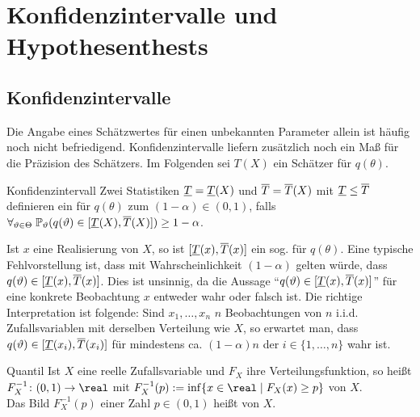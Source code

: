 \chapter{%
    Konfidenzintervalle und Hypothesenthests%
}

\section{%
    Konfidenzintervalle%
}

\begin{Bem}
    Die Angabe eines Schätzwertes für einen unbekannten Parameter allein ist häufig noch nicht
    befriedigend.
    Konfidenzintervalle liefern zusätzlich noch ein Maß für die Präzision des Schätzers.
    Im Folgenden sei $T(X)$ ein Schätzer für $q(\theta)$.
\end{Bem}

\begin{Def}{Konfidenzintervall}
    Zwei Statistiken $\underline{T} = \underline{T}(X)$ und $\overline{T} = \overline{T}(X)$ mit $\underline{T} \le \overline{T}$ definieren
    ein  für $q(\theta)$ zum
     $(1 - \alpha) \in (0, 1)$, falls\\
    $\forall_{\vartheta \in \Theta}\; \mathbb{P}_\vartheta(q(\vartheta) \in [\underline{T}(X), \overline{T}(X)]) \ge 1 - \alpha$.
\end{Def}

\begin{Bem}
    Ist $x$ eine Realisierung von $X$, so ist $[\underline{T}(x), \overline{T}(x)]$ ein sog.
     für $q(\theta)$.
    Eine typische Fehlvorstellung ist,
    dass mit Wahrscheinlichkeit $(1 - \alpha)$ gelten würde, dass $q(\vartheta) \in [\underline{T}(x), \overline{T}(x)]$.
    Dies ist unsinnig, da die Aussage "`$q(\vartheta) \in [\underline{T}(x), \overline{T}(x)]$"'
    für eine konkrete Beobachtung $x$ entweder wahr oder falsch ist.
    Die richtige Interpretation ist folgende:
    Sind $x_1, \dotsc, x_n$ $n$ Beobachtungen von $n$ i.i.d. Zufallsvariablen mit derselben
    Verteilung wie $X$, so erwartet man, dass $q(\vartheta) \in [\underline{T}(x_i), \overline{T}(x_i)]$ für
    mindestens ca. $(1 - \alpha)n$ der $i \in \{1, \dotsc, n\}$ wahr ist.
\end{Bem}

\begin{Def}{Quantil}
    Ist $X$ eine reelle Zufallsvariable und $F_X$ ihre Verteilungsfunktion, so heißt\\
    $F_X^{-1}\colon (0, 1) \rightarrow \real$ mit
    $F_X^{-1}(p) := \inf\{x \in \real \;|\; F_X(x) \ge p\}$
     von $X$.\\
    Das Bild $F_X^{-1}(p)$ einer Zahl $p \in (0, 1)$ heißt  von $X$.
\end{Def}

